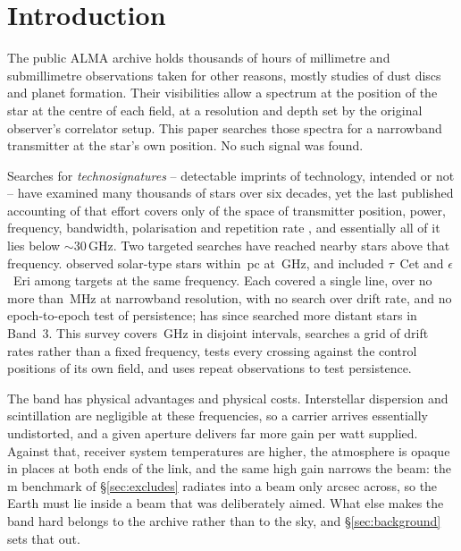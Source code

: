 \section{Introduction}
\label{sec:intro}

The public ALMA archive holds thousands of hours of millimetre and
submillimetre observations taken for other reasons, mostly studies of dust
discs and planet formation. Their visibilities allow a spectrum at the
position of the star at the centre of each field, at a resolution and depth
set by the original observer's correlator setup. This paper searches those
spectra for a narrowband transmitter at the star's own position. No such
signal was found.

Searches for \emph{technosignatures} -- detectable imprints of technology,
intended or not
\citep{Sheikh2020,SETIreview2025} -- have examined many thousands of stars
over six decades, yet the last published accounting of that effort covers
only \HaystackFrac{} of the space of transmitter position, power, frequency,
bandwidth, polarisation and repetition rate
\citep{Wright2018}, and essentially all of it lies below
${\sim}30$\,GHz. Two targeted searches have reached nearby stars above that frequency.
\citet{Steffes1994} observed \SbPriorNStarA{} solar-type stars within
\SbPriorDistA\,pc at \SbPriorFreqGHz\,GHz, and \citet{Mauersberger1996}
included $\tau$~Cet and $\epsilon$~Eri among \SbPriorNStarB{} targets at the
same frequency. Each covered a single line, over no more than
\SbPriorBandMHz\,MHz at narrowband resolution, with no search over drift rate,
and no epoch-to-epoch test of persistence;
\citet{Mason2025} has since searched more distant stars in
Band~3. This survey covers
\DnuA\,GHz in \CovNIslands{} disjoint intervals, searches a grid of drift rates rather
than a fixed frequency, tests every crossing against the \BdNCtrl{} control positions of
its own field, and uses repeat observations to test persistence.

The band has physical advantages and physical costs. Interstellar dispersion
and scintillation are negligible at these frequencies, so a carrier arrives
essentially undistorted, and a given aperture delivers far more gain per watt
supplied. Against that, receiver system temperatures are higher, the
atmosphere is opaque in places at both ends of the link, and the same high
gain narrows the beam: the \BenchDiam\,m benchmark of
\S\ref{sec:excludes} radiates into a beam only \BmArcsec{} arcsec across, so
the Earth must lie inside a beam that was deliberately aimed. What else makes
the band hard belongs to the archive rather than to the sky, and
\S\ref{sec:background} sets that out.

